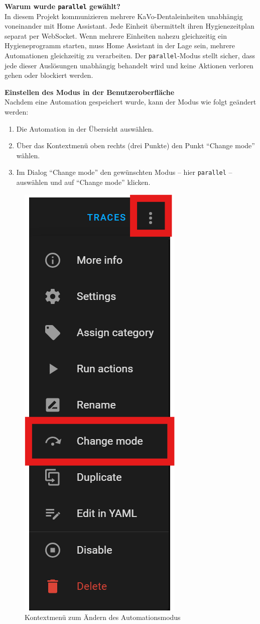 \medskip
\textbf{Warum wurde \texttt{parallel} gewählt?} \\
In diesem Projekt kommunizieren mehrere KaVo-Dentaleinheiten unabhängig voneinander mit Home Assistant. Jede Einheit übermittelt ihren Hygienezeitplan separat per WebSocket. Wenn mehrere Einheiten nahezu gleichzeitig ein Hygieneprogramm starten, muss Home Assistant in der Lage sein, mehrere Automationen gleichzeitig zu verarbeiten. Der \texttt{parallel}-Modus stellt sicher, dass jede dieser Auslösungen unabhängig behandelt wird und keine Aktionen verloren gehen oder blockiert werden.

\medskip
\textbf{Einstellen des Modus in der Benutzeroberfläche} \\
Nachdem eine Automation gespeichert wurde, kann der Modus wie folgt geändert werden:
\begin{enumerate}
  \item Die Automation in der Übersicht auswählen.
  \item Über das Kontextmenü oben rechts (drei Punkte) den Punkt \enquote{Change mode} wählen.
  \item Im Dialog \enquote{Change mode} den gewünschten Modus – hier \texttt{parallel} – auswählen und auf \enquote{Change mode} klicken.
\end{enumerate}

\begin{figure}[H]
    \centering
    \includegraphics[width=0.45\linewidth]{images/changemode_1.png}
    \caption{Kontextmenü zum Ändern des Automationsmodus}
\end{figure}

